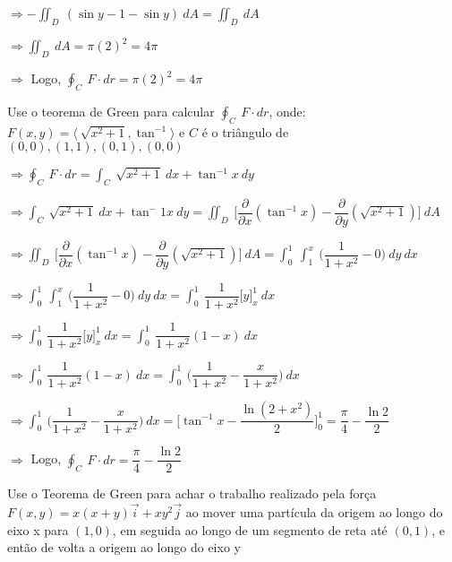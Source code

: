 \documentclass[11pt,a4paper]{article}
\begin{document}
\begin{enumerate}
{		$\Rightarrow  -\displaystyle\iint_D\ (\sin y -1 - \sin y)\ dA = \displaystyle\iint_D\ dA$
		
		$\Rightarrow \displaystyle\iint_D\ dA = \pi(2)^2 = 4\pi$
		
		$\Rightarrow$ Logo, $\displaystyle\oint_C\ F \cdot dr = \pi(2)^2 = 4\pi $
		\item Use o teorema de Green para calcular $\displaystyle\oint_C\ F \cdot dr$, onde: $F(x,y) = \langle\ \sqrt{x^2 +1}, \tan^{-1}\rangle$ e $C$ é o triângulo de $(0,0),(1,1),(0,1),(0,0)$
		
		$\Rightarrow \displaystyle\oint_C\ F \cdot dr = \displaystyle\int_{C}\ \sqrt{x^2 + 1}\ dx + \tan^{-1}x\ dy$ 
		
		$\Rightarrow \displaystyle\int_{C}\ \sqrt{x^2 + 1}\ dx + \tan^-1x\ dy = \displaystyle\iint_D\ \Bigg[\dfrac{\partial}{\partial x}(\tan^{-1}x) - \dfrac{\partial}{\partial y}(\sqrt{x^2 + 1})\Bigg]\ dA$
		
		$\Rightarrow \displaystyle\iint_D\ \Bigg[\dfrac{\partial}{\partial x}(\tan^{-1}x) - \dfrac{\partial}{\partial y}(\sqrt{x^2 + 1})\Bigg]\ dA = \displaystyle\int_{0}^{1}\ \displaystyle\int_{1}^{x}\ \Bigg(\dfrac{1}{1 + x^2} - 0\Bigg)\ dy\ dx$
		
		$\Rightarrow \displaystyle\int_{0}^{1}\ \displaystyle\int_{1}^{x}\ \Bigg(\dfrac{1}{1 + x^2} - 0\Bigg)\ dy\ dx = \displaystyle\int_{0}^{1}\ \dfrac{1}{1 + x^2}\Big[y\Big]_x^1\ dx$
		
		$\Rightarrow \displaystyle\int_{0}^{1}\ \dfrac{1}{1 + x^2}\Big[y\Big]_x^1\ dx = \displaystyle\int_{0}^{1}\ \dfrac{1}{1 + x^2}(1 - x)\ dx$
		
		$\Rightarrow \displaystyle\int_{0}^{1}\ \dfrac{1}{1 + x^2}(1 - x)\ dx = \displaystyle\int_{0}^{1}\ \Bigg(\dfrac{1}{1 + x^2} - \dfrac{x}{1 + x^2}\Bigg)\ dx$
		
		$\Rightarrow \displaystyle\int_{0}^{1}\ \Bigg(\dfrac{1}{1 + x^2} - \dfrac{x}{1 + x^2}\Bigg)\ dx = \Bigg[\tan^{-1}x - \dfrac{\ln (2 + x^2)}{2}\Bigg]_0^1 = \dfrac{\pi}{4} - \dfrac{\ln 2}{2}$
		
		$\Rightarrow$ Logo, $\displaystyle\oint_C\ F \cdot dr = \dfrac{\pi}{4} - \dfrac{\ln 2}{2}$
		
		\item Use o Teorema de Green para achar o trabalho realizado pela força $F(x,y) = x(x+y)\vec{i} + xy^2\vec{j}$ ao mover uma partícula da origem ao longo do eixo x para $(1,0)$, em seguida ao longo de um segmento de reta até $(0,1)$, e então de volta a origem ao longo do eixo y
		
}
\end{enumerate}
\end{document}
